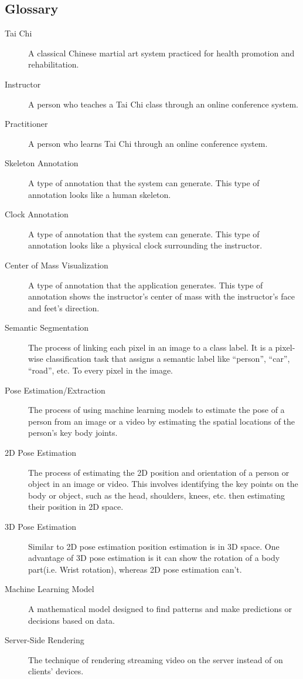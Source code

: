 \documentclass[12pt]{article}
\begin{document}
\subsection{Glossary}\label{Glossary}
\begin{description}
    \item[Tai Chi] A classical Chinese martial art system practiced for health promotion and rehabilitation.
    \item[Instructor] A person who teaches a Tai Chi class through an online conference system.
    \item[Practitioner] A person who learns Tai Chi through an online conference system.
    \item[Skeleton Annotation] A type of annotation that the system can generate. This type of annotation looks like a human skeleton.
    \item[Clock Annotation] A type of annotation that the system can generate. This type of annotation looks like a physical clock surrounding the instructor.
    \item[Center of Mass Visualization] A type of annotation that the application generates. This type of annotation shows the instructor’s center of mass with the instructor's face and feet's direction.
    \item[Semantic Segmentation] The process of linking each pixel in an image to a class label. It is a pixel-wise classification task that assigns a semantic label like “person”, “car”, “road”, etc. To every pixel in the image.
    \item[Pose Estimation/Extraction] The process of using machine learning models to estimate the pose of a person from an image or a video by estimating the spatial locations of the person’s key body joints.
    \item[2D Pose Estimation] The process of estimating the 2D position and orientation of a person or object in an image or video. This involves identifying the key points on the body or object, such as the head, shoulders, knees, etc. then estimating their position in  2D space.
    \item[3D Pose Estimation] Similar to 2D pose estimation position estimation is in 3D space. One advantage of 3D pose estimation is it can show the rotation of a body part(i.e. Wrist rotation), whereas 2D pose estimation can’t.
    \item[Machine Learning Model] A mathematical model designed to find patterns and make predictions or decisions based on data.
    \item[Server-Side Rendering]  The technique of rendering streaming video on the server instead of on clients' devices.

\end{description}
\end{document}
